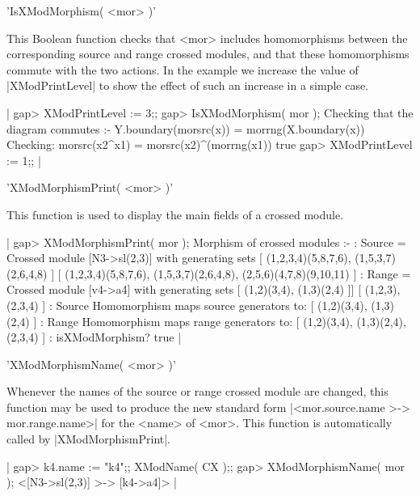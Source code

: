 %

'IsXModMorphism( <mor> )'

This Boolean function checks that <mor> includes homomorphisms between
the corresponding   source and range  crossed  modules, and that these
homomorphisms commute  with   the two  actions.    In the example   we
increase the value  of |XModPrintLevel| to  show the effect of such an
increase in a simple case.

|    gap> XModPrintLevel := 3;;
    gap> IsXModMorphism( mor );
    Checking that the diagram commutes :- 
             Y.boundary(morsrc(x)) = morrng(X.boundary(x)) 
    Checking:  morsrc(x2^x1) = morsrc(x2)^(morrng(x1))
    true
    gap> XModPrintLevel := 1;;   |

%

'XModMorphismPrint( <mor> )'

This function is used to display the main fields of a crossed module.

|    gap> XModMorphismPrint( mor );
    Morphism of crossed modules :-
    : Source = Crossed module [N3->sl(2,3)] with generating sets
      [ (1,2,3,4)(5,8,7,6), (1,5,3,7)(2,6,4,8) ]
      [ (1,2,3,4)(5,8,7,6), (1,5,3,7)(2,6,4,8), (2,5,6)(4,7,8)(9,10,11) ]
    :  Range = Crossed module [v4->a4] with generating sets
      [ (1,2)(3,4), (1,3)(2,4) ]]
      [ (1,2,3), (2,3,4) ]
    : Source Homomorphism maps source generators to:
      [ (1,2)(3,4), (1,3)(2,4) ]
    : Range Homomorphism maps range generators to:
      [ (1,2)(3,4), (1,3)(2,4), (2,3,4) ]
    : isXModMorphism? true  |

%

'XModMorphismName( <mor> )'

Whenever the names of the source  or range crossed module are changed,
this    function may  be  used to    produce the    new standard  form
|<mor.source.name >-> mor.range.name>| for the  <name> of <mor>.  This
function is automatically called by |XModMorphismPrint|.

|    gap> k4.name := "k4";;  XModName( CX );;
    gap> XModMorphismName( mor );
    <[N3->sl(2,3)] >-> [k4->a4]>  |
    
